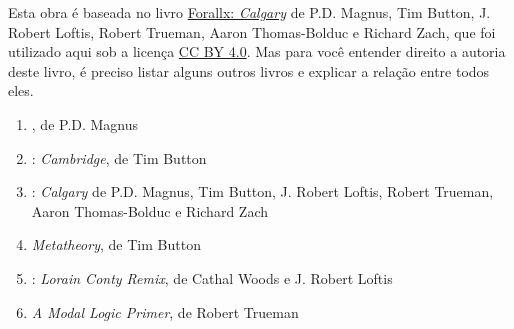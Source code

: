 \newpage

\noindent Esta obra é baseada no livro \href{https://github.com/rzach/forallx-yyc}{Forallx: \textit{Calgary}} de P.D. Magnus, Tim Button, J. Robert Loftis, Robert Trueman, Aaron Thomas-Bolduc e Richard Zach, que foi utilizado aqui sob a licença \href{https://creativecommons.org/licenses/by/4.0/}{CC BY 4.0}.
Mas para você entender direito a autoria deste livro, é preciso listar alguns outros livros e explicar a relação entre todos eles.

\begin{enumerate}
   \item \forallx, de P.D. Magnus

   \item \forallx: \textit{Cambridge}, de Tim Button

   \item \forallx: \textit{Calgary} de P.D. Magnus, Tim Button, J. Robert Loftis, Robert Trueman, Aaron Thomas-Bolduc e Richard Zach
   
   \item \textit{Metatheory}, de Tim Button
   
   \item  \forallx: \textit{Lorain Conty Remix}, de Cathal Woods e J. Robert Loftis
   
   \item \textit{A Modal Logic Primer}, de Robert Trueman
\end{enumerate}

